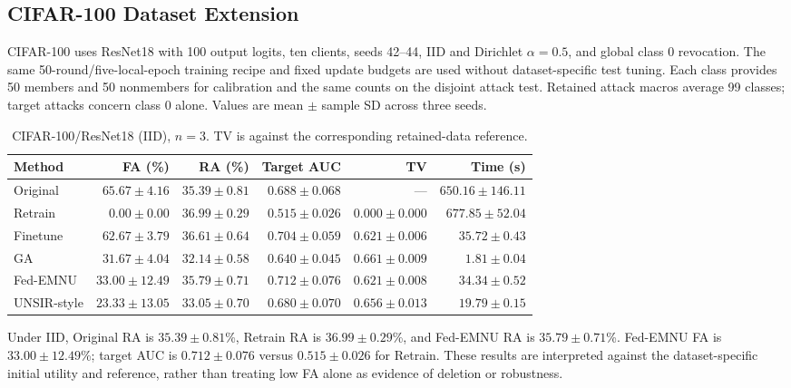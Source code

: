 \subsection{CIFAR-100 Dataset Extension}

\label{sec:cifar100}

CIFAR-100 uses ResNet18 with 100 output logits, ten clients, seeds 42--44, IID and Dirichlet $\alpha=0.5$, and global class 0 revocation. The same 50-round/five-local-epoch training recipe and fixed update budgets are used without dataset-specific test tuning. Each class provides 50 members and 50 nonmembers for calibration and the same counts on the disjoint attack test. Retained attack macros average 99 classes; target attacks concern class 0 alone. Values are mean $\pm$ sample SD across three seeds.

\begin{table}[H]
\caption{CIFAR-100/ResNet18 (IID), $n=3$. TV is against the corresponding retained-data reference.}
\label{tab:c100-iid}
\centering\scriptsize\setlength{\tabcolsep}{3.5pt}
\begin{tabular}{lrrrrr}
\toprule
Method & FA (\%) & RA (\%) & Target AUC & TV & Time (s)\\
\midrule
Original & $65.67 \pm 4.16$ & $35.39 \pm 0.81$ & $0.688 \pm 0.068$ & --- & $650.16 \pm 146.11$\\
Retrain & $0.00 \pm 0.00$ & $36.99 \pm 0.29$ & $0.515 \pm 0.026$ & $0.000 \pm 0.000$ & $677.85 \pm 52.04$\\
Finetune & $62.67 \pm 3.79$ & $36.61 \pm 0.64$ & $0.704 \pm 0.059$ & $0.621 \pm 0.006$ & $35.72 \pm 0.43$\\
GA & $31.67 \pm 4.04$ & $32.14 \pm 0.58$ & $0.640 \pm 0.045$ & $0.661 \pm 0.009$ & $1.81 \pm 0.04$\\
Fed-EMNU & $33.00 \pm 12.49$ & $35.79 \pm 0.71$ & $0.712 \pm 0.076$ & $0.621 \pm 0.008$ & $34.34 \pm 0.52$\\
UNSIR-style & $23.33 \pm 13.05$ & $33.05 \pm 0.70$ & $0.680 \pm 0.070$ & $0.656 \pm 0.013$ & $19.79 \pm 0.15$\\
\bottomrule
\end{tabular}
\end{table}

Under IID, Original RA is $35.39 \pm 0.81$\%, Retrain RA is $36.99 \pm 0.29$\%, and Fed-EMNU RA is $35.79 \pm 0.71$\%. Fed-EMNU FA is $33.00 \pm 12.49$\%; target AUC is $0.712 \pm 0.076$ versus $0.515 \pm 0.026$ for Retrain. These results are interpreted against the dataset-specific initial utility and reference, rather than treating low FA alone as evidence of deletion or robustness.

